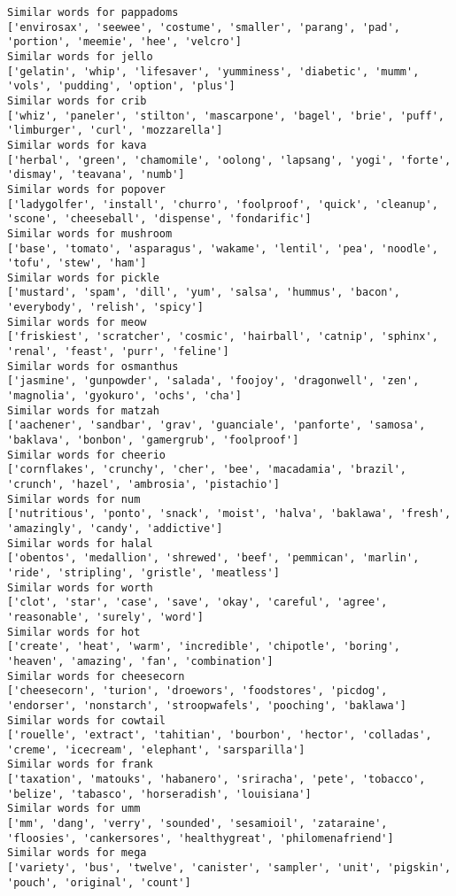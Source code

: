\documentclass[11pt]{article}
\begin{document}
\begin{Verbatim}[commandchars=\\\{\}]
Similar words for pappadoms
['envirosax', 'seewee', 'costume', 'smaller', 'parang', 'pad', 'portion', 'meemie', 'hee', 'velcro']
Similar words for jello
['gelatin', 'whip', 'lifesaver', 'yumminess', 'diabetic', 'mumm', 'vols', 'pudding', 'option', 'plus']
Similar words for crib
['whiz', 'paneler', 'stilton', 'mascarpone', 'bagel', 'brie', 'puff', 'limburger', 'curl', 'mozzarella']
Similar words for kava
['herbal', 'green', 'chamomile', 'oolong', 'lapsang', 'yogi', 'forte', 'dismay', 'teavana', 'numb']
Similar words for popover
['ladygolfer', 'install', 'churro', 'foolproof', 'quick', 'cleanup', 'scone', 'cheeseball', 'dispense', 'fondarific']
Similar words for mushroom
['base', 'tomato', 'asparagus', 'wakame', 'lentil', 'pea', 'noodle', 'tofu', 'stew', 'ham']
Similar words for pickle
['mustard', 'spam', 'dill', 'yum', 'salsa', 'hummus', 'bacon', 'everybody', 'relish', 'spicy']
Similar words for meow
['friskiest', 'scratcher', 'cosmic', 'hairball', 'catnip', 'sphinx', 'renal', 'feast', 'purr', 'feline']
Similar words for osmanthus
['jasmine', 'gunpowder', 'salada', 'foojoy', 'dragonwell', 'zen', 'magnolia', 'gyokuro', 'ochs', 'cha']
Similar words for matzah
['aachener', 'sandbar', 'grav', 'guanciale', 'panforte', 'samosa', 'baklava', 'bonbon', 'gamergrub', 'foolproof']
Similar words for cheerio
['cornflakes', 'crunchy', 'cher', 'bee', 'macadamia', 'brazil', 'crunch', 'hazel', 'ambrosia', 'pistachio']
Similar words for num
['nutritious', 'ponto', 'snack', 'moist', 'halva', 'baklawa', 'fresh', 'amazingly', 'candy', 'addictive']
Similar words for halal
['obentos', 'medallion', 'shrewed', 'beef', 'pemmican', 'marlin', 'ride', 'stripling', 'gristle', 'meatless']
Similar words for worth
['clot', 'star', 'case', 'save', 'okay', 'careful', 'agree', 'reasonable', 'surely', 'word']
Similar words for hot
['create', 'heat', 'warm', 'incredible', 'chipotle', 'boring', 'heaven', 'amazing', 'fan', 'combination']
Similar words for cheesecorn
['cheesecorn', 'turion', 'droewors', 'foodstores', 'picdog', 'endorser', 'nonstarch', 'stroopwafels', 'pooching', 'baklawa']
Similar words for cowtail
['rouelle', 'extract', 'tahitian', 'bourbon', 'hector', 'colladas', 'creme', 'icecream', 'elephant', 'sarsparilla']
Similar words for frank
['taxation', 'matouks', 'habanero', 'sriracha', 'pete', 'tobacco', 'belize', 'tabasco', 'horseradish', 'louisiana']
Similar words for umm
['mm', 'dang', 'verry', 'sounded', 'sesamioil', 'zataraine', 'floosies', 'cankersores', 'healthygreat', 'philomenafriend']
Similar words for mega
['variety', 'bus', 'twelve', 'canister', 'sampler', 'unit', 'pigskin', 'pouch', 'original', 'count']

\end{Verbatim}
\end{document}
